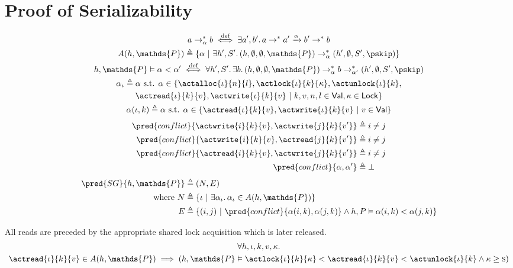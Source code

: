 \section{Proof of Serializability}

\begin{gather*}
a \rightarrow^*_\alpha b \overset{\text{def}}{\iff} \exists a', b' \ldotp a \rightarrow^* a' \xrightarrow{\alpha} b' \rightarrow^* b
\\
A(h, \mathds{P}) \triangleq \{ \alpha\ |\ \exists h', S' \ldotp (h, \emptyset, \emptyset, \mathds{P}) \rightarrow_\alpha^* (h', \emptyset, S', \pskip) \}
\\
h, \mathds{P} \vDash \alpha < \alpha' \overset{\text{def}}{\iff} \forall h', S' \ldotp \exists b \ldotp (h, \emptyset, \emptyset, \mathds{P}) \rightarrow_\alpha^* b \rightarrow^*_{\alpha'} (h', \emptyset, S', \pskip)
\\
\alpha_\iota \triangleq \alpha \text{ s.t. } \alpha \in \{ \actalloc{\iota}{n}{l}, \actlock{\iota}{k}{\kappa}, \actunlock{\iota}{k}, \\ \actread{\iota}{k}{v}, \actwrite{\iota}{k}{v}\ |\ k, v, n, l \in \mathsf{Val}, \kappa \in \mathsf{Lock} \}
\\
\alpha(\iota, k) \triangleq \alpha \text{ s.t. } \alpha \in \{ \actread{\iota}{k}{v}, \actwrite{\iota}{k}{v}\ |\ v \in \mathsf{Val} \}
\end{gather*}
\begin{align*}
\pred{conflict}{\actwrite{i}{k}{v}, \actwrite{j}{k}{v'}} &\triangleq i \neq j
\\
\pred{conflict}{\actwrite{i}{k}{v}, \actread{j}{k}{v'}} &\triangleq i \neq j
\\
\pred{conflict}{\actread{i}{k}{v}, \actwrite{j}{k}{v'}} &\triangleq i \neq j
\\
\pred{conflict}{\alpha, \alpha'} &\triangleq \bot 
\end{align*}
\begin{align*}
\pred{SG}{h, \mathds{P}} &\triangleq (N, E) \\
\text{where } N &\triangleq \{ \iota\ |\ \exists \alpha_\iota \ldotp \alpha_\iota \in A(h, \mathds{P}) \} \\
E &\triangleq \{ (i, j)\ |\ \pred{conflict}{\alpha(i, k), \alpha(j, k)} \land h, P \vDash \alpha(i, k) < \alpha(j, k) \}
\end{align*}

\lem \label{lem:read} All reads are preceded by the appropriate shared lock acquisition which is later released.
\begin{gather*}
\forall h, \iota, k, v, \kappa \ldotp \\
\actread{\iota}{k}{v} \in A(h, \mathds{P}) \implies \left( h, \mathds{P} \vDash \actlock{\iota}{k}{\kappa} < \actread{\iota}{k}{v} < \actunlock{\iota}{k} \land \kappa \geq \textsc{s} \right)
\end{gather*}


